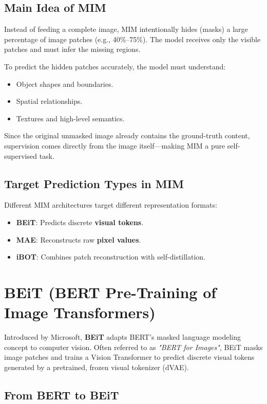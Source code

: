 \subsection{Main Idea of MIM}

Instead of feeding a complete image, MIM intentionally hides (masks) a large percentage of image patches (e.g., 40\%--75\%). The model receives only the visible patches and must infer the missing regions.

To predict the hidden patches accurately, the model must understand:
\begin{itemize}
    \item Object shapes and boundaries.
    \item Spatial relationships.
    \item Textures and high-level semantics.
\end{itemize}

Since the original unmasked image already contains the ground-truth content, supervision comes directly from the image itself—making MIM a pure self-supervised task.

\subsection{Target Prediction Types in MIM}

Different MIM architectures target different representation formats:
\begin{itemize}
    \item \textbf{BEiT}: Predicts discrete \textbf{visual tokens}.
    \item \textbf{MAE}: Reconstructs raw \textbf{pixel values}.
    \item \textbf{iBOT}: Combines patch reconstruction with self-distillation.
\end{itemize}

\section{BEiT (BERT Pre-Training of Image Transformers)}

Introduced by Microsoft, \textbf{BEiT} adapts BERT's masked language modeling concept to computer vision. Often referred to as \emph{"BERT for Images"}, BEiT masks image patches and trains a Vision Transformer to predict discrete visual tokens generated by a pretrained, frozen visual tokenizer (dVAE).

\subsection{From BERT to BEiT}


